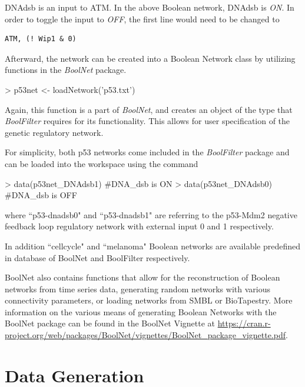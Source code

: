 \documentclass[a4paper]{article}
\theoremstyle{plain}
\theoremstyle{definition}
\theoremstyle{remark}
\begin{document}
DNA\textunderscore dsb is an input to ATM. In the above Boolean network, DNA\textunderscore dsb is \textit{ON}. In order to toggle the input to \textit{OFF}, the first line would need to be changed to 

\begin{verbatim}
ATM, (! Wip1 & 0)
\end{verbatim}

Afterward, the network can be created into a Boolean Network class by utilizing functions in the \textit{BoolNet} package.
\begin{Schunk}
\begin{Sinput}
> p53net <- loadNetwork('p53.txt')
\end{Sinput}
\end{Schunk}
Again, this function is a part of \textit{BoolNet}, and creates an object of the type that \textit{BoolFilter} requires for its functionality. This allows for user specification of the genetic regulatory network. 

For simplicity, both p53 networks come included in the \textit{BoolFilter} package and can be loaded into the workspace using the command

\begin{Schunk}
\begin{Sinput}
> data(p53net_DNAdsb1) #DNA_dsb is ON
> data(p53net_DNAdsb0) #DNA_dsb is OFF
\end{Sinput}
\end{Schunk}
where ``p53-dnadsb0" and ``p53-dnadsb1" are referring to the p53-Mdm2 negative feedback loop regulatory network with external input 0 and 1 respectively.

In addition ``cellcycle" and ``melanoma" Boolean networks are available predefined in database of BoolNet and BoolFilter respectively. 

BoolNet also contains functions that allow for the reconstruction of Boolean networks from time series data, generating random networks with various connectivity parameters, or loading networks from SMBL or BioTapestry. More information on the various means of generating Boolean Networks with the BoolNet package can be found in the BoolNet Vignette at 
\url{https://cran.r-project.org/web/packages/BoolNet/vignettes/BoolNet_package_vignette.pdf}.

\section{Data Generation}
\end{document}
